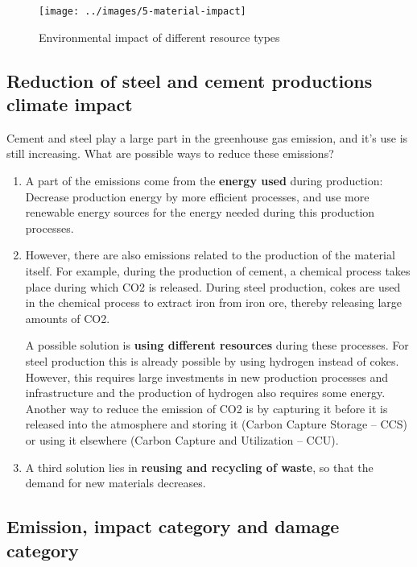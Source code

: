 \documentclass[../summary.tex]{subfiles}
\begin{document}
	\begin{figure}[H]
		\centering
		\texttt{[image: ../images/5-material-impact]}
		\caption{Environmental impact of different resource types}
		\label{fig:5-material-impact}
	\end{figure}
	\newpage
	
	\subsection{Reduction of steel and cement productions climate impact}
	
	Cement and steel play a large part in the greenhouse gas emission, and it’s use is still increasing. What are possible ways to reduce these emissions?
	
	\begin{enumerate}
		\item A part of the emissions come from the \textbf{energy used} during production: Decrease production energy by more efficient processes, and use more renewable energy sources for the energy needed during this production processes. 
		\item However, there are also emissions related to the production of the material itself. For example, during the production of cement, a chemical process takes place during which CO2 is released. During steel production, cokes are used in the chemical process to extract iron from iron ore, thereby releasing large amounts of CO2. 
		
		A possible solution is \textbf{using different resources} during these processes. For steel production this is already possible by using hydrogen instead of cokes. However, this requires large investments in new production processes and infrastructure and the production of hydrogen also requires some energy. Another way to reduce the emission of CO2 is by capturing it before it is released into the atmosphere and storing it (Carbon Capture Storage – CCS) or using it elsewhere (Carbon Capture and Utilization – CCU). 
		\item A third solution lies in \textbf{reusing and recycling of waste}, so that the demand for new materials decreases. 
	
	\end{enumerate}
	
	\subsection{Emission, impact category and damage category}
	
\end{document}
